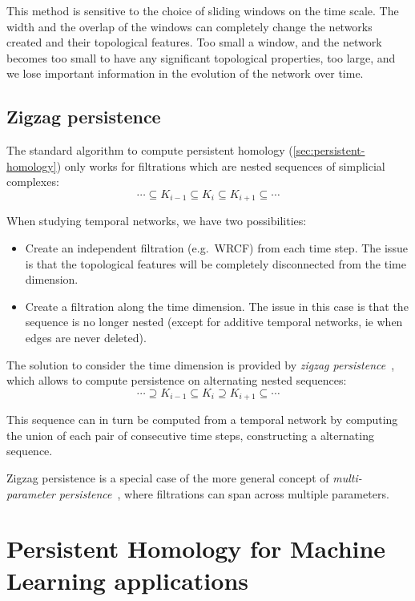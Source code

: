 \documentclass[a4paper,11pt,openany,extrafontsizes]{memoir}
\begin{document}
This method is sensitive to the choice of sliding windows on the time
scale. The width and the overlap of the windows can completely change
the networks created and their topological features. Too small a
window, and the network becomes too small to have any significant
topological properties, too large, and we lose important information
in the evolution of the network over time.

\section{Zigzag persistence}%
\label{sec:zigzag-persistence}

The standard algorithm to compute persistent homology
(\autoref{sec:persistent-homology}) only works for filtrations which
are nested sequences of simplicial complexes:
\[ \cdots \subseteq K_{i-1} \subseteq K_i \subseteq K_{i+1} \subseteq
  \cdots \]

When studying temporal networks, we have two possibilities:
\begin{itemize}
\item Create an independent filtration (e.g.\ WRCF) from each time
  step. The issue is that the topological features will be completely
  disconnected from the time dimension.
\item Create a filtration along the time dimension. The issue in this
  case is that the sequence is no longer nested (except for additive
  temporal networks, ie when edges are never deleted).
\end{itemize}

The solution to consider the time dimension is provided by
\emph{zigzag persistence}~\cite{carlsson_zigzag_2009}, which allows to
compute persistence on alternating nested sequences:
\[ \cdots \supseteq K_{i-1} \subseteq K_i \supseteq K_{i+1} \subseteq
  \cdots \]

This sequence can in turn be computed from a temporal network by
computing the union of each pair of consecutive time steps,
constructing a alternating sequence.

Zigzag persistence is a special case of the more general concept of
\emph{multi-parameter
  persistence}~\cite{carlsson_theory_2009,dey_computing_2014}, where
filtrations can span across multiple parameters.


\chapter{Persistent Homology for Machine Learning applications}%
\label{cha:pers-homol-mach}
\end{document}
